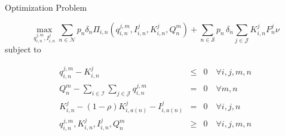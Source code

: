 \begin{frame}{Optimization Problem}

\begin{equation*}
  \label{eq:objfct}
  \max_{q_{i,n}^{j,m}, I_{i,n}^{j}} \sum_{n\in \mathcal{N}}p_n\delta_n\Pi_{i,n}\left(q_{i,n}^{j,m}, I_{i,n}^{j}, K_{i,n}^{j}, Q_n^m\right)+ \sum_{n\in \mathcal{S}}p_n\,\delta_n \sum_{j\in \mathcal{J}}K_{i,n}^{j}F_n^{j}\nu
\end{equation*}
subject to
  
\begin{eqnarray*}  
q_{i,n}^{j,m} - K_{i,n}^{j} &\leq& 0 \quad \forall i,j,m,n \label{eq:prodconstr} \\
Q_n^m-\sum_{i\in \mathcal{I}}\sum_{j\in \mathcal{J}} q_{i,n}^{j,m} &=& 0 \quad \forall m,n \label{eq:marketclearing}\\
K_{i,n}^{j} - (1-\rho)K_{i,a(n)}^{j}-I_{i,a(n)}^{j} &=& 0 \quad \forall i,j,n \label{eq:state} \\
q_{i,n}^{j,m}, K_{i,n}^{j}, I_{i,n}^{j}, Q_n^m  &\geq& 0 \quad \forall i,j,m,n\label{eq:nonneg}
\end{eqnarray*}
  
\end{frame}

